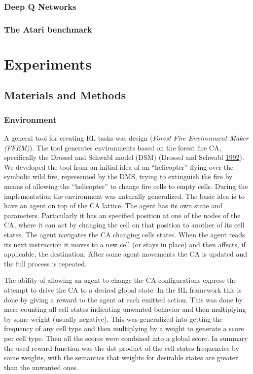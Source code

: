 \documentclass[
  openany]{book}
\begin{document}
\hypertarget{deep-q-networks}{%
\subsection{Deep Q Networks}\label{deep-q-networks}}

\hypertarget{the-atari-benchmark}{%
\subsection{The Atari benchmark}\label{the-atari-benchmark}}

\hypertarget{experiments}{%
\chapter{Experiments}\label{experiments}}

\hypertarget{materials-and-methods}{%
\section{Materials and Methods}\label{materials-and-methods}}

\hypertarget{environment}{%
\subsection{Environment}\label{environment}}

A general tool for creating RL tasks was design (\emph{Forest Fire Environment Maker (FFEM)}). The tool generates environments based on the forest fire CA, specifically the Drossel and Schwabl model (DSM) (Drossel and Schwabl \protect\hyperlink{ref-drossel1992self}{1992}). We developed the tool from an initial idea of an ``helicopter'' flying over the symbolic wild fire, represented by the DMS, trying to extinguish the fire by means of allowing the ``helicopter'' to change fire cells to empty cells. During the implementation the environment was naturally generalized. The basic idea is to have an agent on top of the CA lattice. The agent has its own state and parameters. Particularly it has an specified position at one of the nodes of the CA, where it can act by changing the cell on that position to another of its cell states. The agent navigates the CA changing cells states. When the agent reads its next instruction it moves to a new cell (or stays in place) and then affects, if applicable, the destination. After some agent movements the CA is updated and the full process is repeated.

The ability of allowing an agent to change the CA configurations express the attempt to drive the CA to a desired global state. In the RL framework this is done by giving a reward to the agent at each emitted action. This was done by mere counting all cell states indicating unwanted behavior and then multiplying by some weight (usually negative). This was generalized into getting the frequency of any cell type and then multiplying by a weight to generate a score per cell type. Then all the scores were combined into a global score. In summary the used reward function was the dot product of the cell-states frequencies by some weights, with the semantics that weights for desirable states are greater than the unwanted ones.
\end{document}
